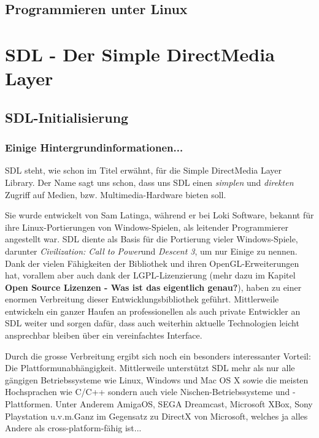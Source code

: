\documentclass[b5paper,10pt,dvips,fleqn,titlepage,twoside]{book}
\begin{document}
\chapter{Programmieren unter Linux}


\part{SDL - Der Simple DirectMedia Layer}
\label{part:SDL}
\chapter{SDL-Initialisierung}
\section{Einige Hintergrundinformationen...}
SDL steht, wie schon im Titel erw\"{a}hnt, f\"{u}r die Simple DirectMedia Layer Library. Der Name sagt uns schon, dass uns SDL einen \textit{simplen} und \textit{direkten} Zugriff auf Medien, bzw. Multimedia-Hardware bieten soll.

	Sie wurde entwickelt von Sam Latinga, w\"{a}hrend er bei Loki Software, bekannt f\"{u}r ihre Linux-Portierungen von Windows-Spielen, als leitender Programmierer angestellt war.
SDL diente als Basis f\"{u}r die Portierung vieler Windows-Spiele, darunter \emph{Civilization: Call to Power}und \emph{Descent 3}, um nur Einige zu nennen.\\
Dank der vielen F\"{a}higkeiten der Bibliothek und ihren OpenGL-Erweiterungen hat, vorallem aber auch dank der LGPL-Lizenzierung (mehr dazu im Kapitel \textbf{Open Source Lizenzen - Was ist das eigentlich genau?}), haben zu einer enormen Verbreitung dieser Entwicklungsbibliothek gef\"{u}hrt. Mittlerweile entwickeln ein ganzer Haufen an professionellen als auch private Entwickler an SDL weiter und sorgen daf\"{u}r, dass auch weiterhin aktuelle Technologien leicht ansprechbar bleiben \"{u}ber ein vereinfachtes Interface.

Durch die grosse Verbreitung ergibt sich noch ein besonders interessanter Vorteil: Die Plattformunabh\"{a}ngigkeit. Mittlerweile unterst\"{u}tzt SDL mehr als nur alle g\"{a}ngigen Betriebssysteme wie Linux, Windows und Mac OS X sowie die meisten Hochsprachen wie C/C++ sondern auch viele Nischen-Betriebssysteme und -Plattformen. Unter Anderem AmigaOS, SEGA Dreamcast, Microsoft XBox, Sony Playstation u.v.m.\newline Ganz im Gegensatz zu DirectX von Microsoft, welches ja alles Andere als cross-platform-f\"{a}hig ist...
\end{document}
